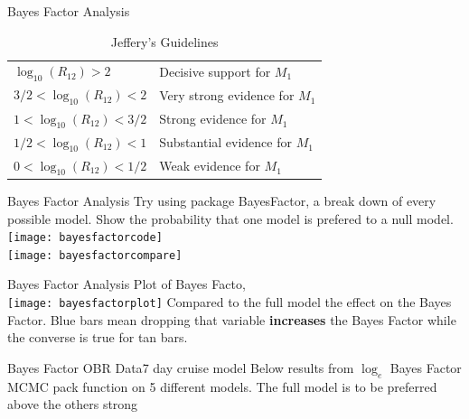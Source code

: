 \documentclass[table]{beamer}
\begin{document}
\begin{frame}{Bayes Factor Analysis}
	\begin{table}
		\caption{Jeffery's Guidelines}
		\begin{tabular}{ll}
			\hline
			\hline 
			$ \log_{10}(R_{12}) > 2 $ & Decisive support for $ M_1 $ \\
			$ 3/2 < \log_{10}(R_{12}) < 2 $ & Very strong evidence for $ M_1 $ \\
			$ 1 < \log_{10}(R_{12}) < 3/2 $ & Strong evidence for $ M_1 $ \\
			$ 1/2 < \log_{10}(R_{12}) < 1 $ & Substantial evidence for $ M_1 $ \\
			$ 0 < \log_{10}(R_{12}) < 1/2 $ & Weak evidence for $ M_1 $ \\
			\hline
			\hline
		\end{tabular}
	\end{table}
\end{frame}

\begin{frame}{Bayes Factor Analysis}
	Try using package BayesFactor, a break down of every possible model. Show the probability that one model is prefered to a null model.
	\texttt{[image: bayesfactorcode]}\\
	\texttt{[image: bayesfactorcompare]}
\end{frame}
                                                                                          
\begin{frame}{Bayes Factor Analysis}
	Plot of Bayes Facto,\\
	\texttt{[image: bayesfactorplot]}
	Compared to the full model the effect on the Bayes Factor. Blue bars mean dropping that variable \textbf{increases} the Bayes Factor while the converse is true for tan bars. 
\end{frame}

\begin{frame}{Bayes Factor OBR Data}{7 day cruise model}
Below results from $ \log_e $ Bayes Factor MCMC pack function on 5 different models. The full model is to be preferred above the others strong
	\begin{table}
	\end{table}
\end{frame}
\end{document}
